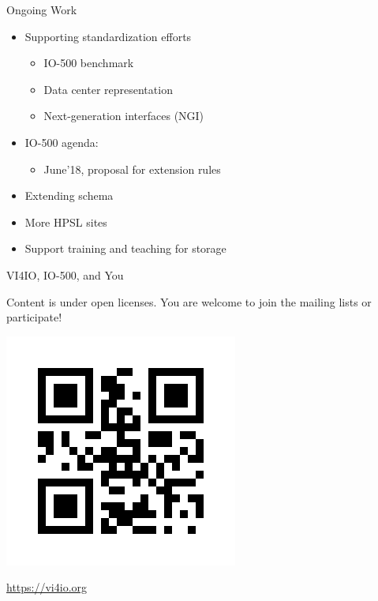 \documentclass[portrait,a0paper,fontscale=0.4]{baposter}
\newcommand{\compresslist}{%
\setlength{\itemsep}{1pt}%
\setlength{\parskip}{0pt}%
\setlength{\parsep}{0pt}%
}
\begin{document}
\begin{poster}
\begin{posterbox}[name=b4,column=3,below=awareness]{Ongoing Work}
\begin{itemize}\compresslist
\item Supporting standardization efforts
  \begin{itemize}\compresslist
  \item IO-500 benchmark
  \item Data center representation
  \item Next-generation interfaces (NGI)
  \end{itemize}
\item IO-500 agenda:
  \begin{itemize}
  \item June'18, proposal for extension rules
  \end{itemize}
\item Extending schema
\item More HPSL sites
\item Support training and teaching for storage
\end{itemize}
\end{posterbox}


\begin{posterbox}[name=hpccertification,column=3,below=b4, above=bottom]{VI4IO, IO-500, and You}

\begin{minipage}{0.7\textwidth}
Content is under open licenses.
You are welcome to join the mailing lists or participate!
\end{minipage}
\begin{minipage}{0.29\textwidth}
\includegraphics[width=\textwidth]{qr-code.jpg}
\end{minipage}

\vspace*{-0.5em}


\huge \url{https://vi4io.org}
\end{posterbox}


\end{poster}
\end{document}
